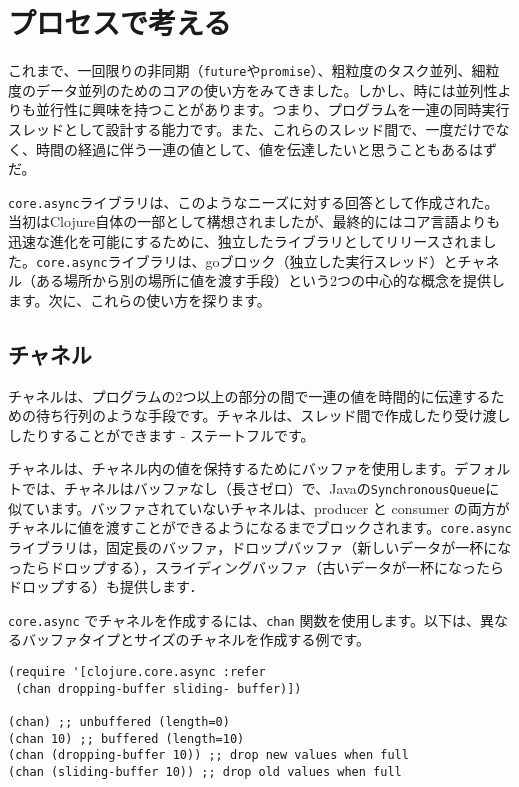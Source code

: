 \section{プロセスで考える}

これまで、一回限りの非同期（\texttt{future}や\texttt{promise}）、粗粒度のタスク並列、細粒度のデータ並列のためのコアの使い方をみてきました。しかし、時には並列性よりも並行性に興味を持つことがあります。つまり、プログラムを一連の同時実行スレッドとして設計する能力です。また、これらのスレッド間で、一度だけでなく、時間の経過に伴う一連の値として、値を伝達したいと思うこともあるはずだ。

\texttt{core.async}ライブラリは、このようなニーズに対する回答として作成された。当初はClojure自体の一部として構想されましたが、最終的にはコア言語よりも迅速な進化を可能にするために、独立したライブラリとしてリリースされました。\texttt{core.async}ライブラリは、goブロック（独立した実行スレッド）とチャネル（ある場所から別の場所に値を渡す手段）という2つの中心的な概念を提供します。次に、これらの使い方を探ります。


\subsection{チャネル}

チャネルは、プログラムの2つ以上の部分の間で一連の値を時間的に伝達するための待ち行列のような手段です。チャネルは、スレッド間で作成したり受け渡ししたりすることができます - ステートフルです。

チャネルは、チャネル内の値を保持するためにバッファを使用します。デフォルトでは、チャネルはバッファなし（長さゼロ）で、Javaの\texttt{SynchronousQueue}に似ています。バッファされていないチャネルは、producer と consumer の両方がチャネルに値を渡すことができるようになるまでブロックされます。\texttt{core.async} ライブラリは，固定長のバッファ，ドロップバッファ（新しいデータが一杯になったらドロップする），スライディングバッファ（古いデータが一杯になったらドロップする）も提供します．

\texttt{core.async} でチャネルを作成するには、\texttt{chan} 関数を使用します。以下は、異なるバッファタイプとサイズのチャネルを作成する例です。

\begin{lstlisting}[numbers=none]
(require '[clojure.core.async :refer
 (chan dropping-buffer sliding- buffer)])

(chan) ;; unbuffered (length=0)
(chan 10) ;; buffered (length=10)
(chan (dropping-buffer 10)) ;; drop new values when full
(chan (sliding-buffer 10)) ;; drop old values when full
\end{lstlisting}

